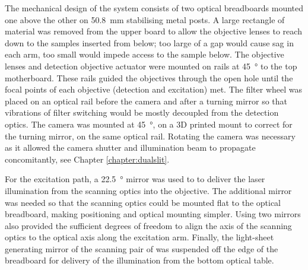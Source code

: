The mechanical design of the system consists of two optical breadboards mounted one above the other on \SI{50.8}{\milli\metre} stabilising metal posts.
A large rectangle of material was removed from the upper board to allow the objective lenses to reach down to the samples inserted from below; too large of a gap would cause sag in each arm, too small would impede access to the sample below.
The objective lenses and detection objective actuator were mounted on rails at \SI{45}{\degree} to the top motherboard.
These rails guided the objectives through the open hole until the focal points of each objective (detection and excitation) met.
The filter wheel was placed on an optical rail before the camera and after a turning mirror so that vibrations of filter switching would be mostly decoupled from the detection optics.
The camera was mounted at \SI{45}{\degree}, on a 3D printed mount to correct for the turning mirror, on the same optical rail.
Rotating the camera was necessary as it allowed the camera shutter and illumination beam to propagate concomitantly, see Chapter \ref{chapter:dualslit}.

For the excitation path, a \SI{22.5}{\degree} mirror was used to to deliver the laser illumination from the scanning optics into the objective.
The additional mirror was needed so that the scanning optics could be mounted flat to the optical breadboard, making positioning and optical mounting simpler.
Using two mirrors also provided the sufficient degrees of freedom to align the axis of the scanning optics to the optical axis along the excitation arm.
Finally, the light-sheet generating mirror of the scanning pair of was suspended off the edge of the breadboard for delivery of the  illumination from the bottom optical table.





